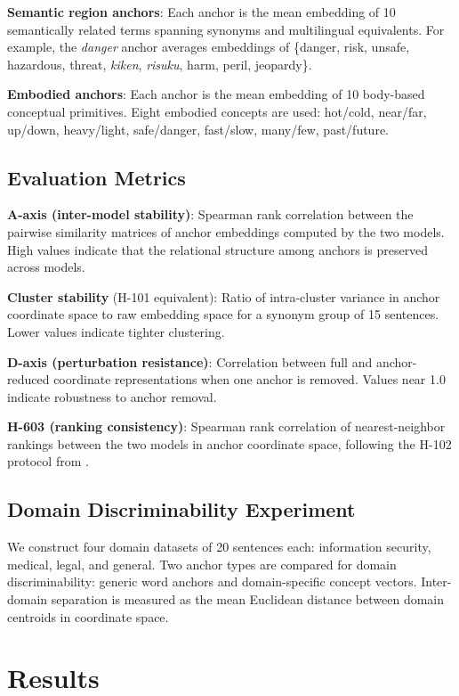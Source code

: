 \documentclass[11pt,a4paper]{article}
\begin{document}
\textbf{Semantic region anchors}: Each anchor is the mean embedding of
10 semantically related terms spanning synonyms and multilingual
equivalents. For example, the \textit{danger} anchor averages embeddings
of \{danger, risk, unsafe, hazardous, threat, \textit{kiken}, \textit{risuku}, harm, peril,
jeopardy\}.

\textbf{Embodied anchors}: Each anchor is the mean embedding of 10
body-based conceptual primitives. Eight embodied concepts are used:
hot/cold, near/far, up/down, heavy/light, safe/danger, fast/slow,
many/few, past/future.

\subsection{Evaluation Metrics}

\textbf{A-axis (inter-model stability)}: Spearman rank correlation
between the pairwise similarity matrices of anchor embeddings computed
by the two models. High values indicate that the relational structure
among anchors is preserved across models.

\textbf{Cluster stability} (H-101 equivalent): Ratio of intra-cluster
variance in anchor coordinate space to raw embedding space for a
synonym group of 15 sentences. Lower values indicate tighter clustering.

\textbf{D-axis (perturbation resistance)}: Correlation between full and
anchor-reduced coordinate representations when one anchor is removed.
Values near 1.0 indicate robustness to anchor removal.

\textbf{H-603 (ranking consistency)}: Spearman rank correlation of
nearest-neighbor rankings between the two models in anchor coordinate
space, following the H-102 protocol from \cite{saitou2026poc}.

\subsection{Domain Discriminability Experiment}

We construct four domain datasets of 20 sentences each: information
security, medical, legal, and general. Two anchor types are compared
for domain discriminability: generic word anchors and domain-specific
concept vectors. Inter-domain separation is measured as the mean
Euclidean distance between domain centroids in coordinate space.

\section{Results}
\label{sec:results}
\end{document}
